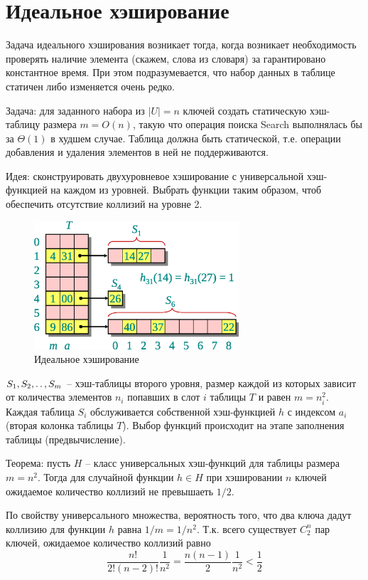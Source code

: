 \documentclass[11pt]{article}
\begin{document}
\section{Идеальное хэширование}

Задача идеального хэширования возникает тогда, когда возникает необходимость проверять наличие элемента (скажем, слова из словаря) за гарантировано константное время. При этом подразумевается, что набор данных в таблице статичен либо изменяется очень редко.

Задача: для заданного набора из $|U| = n$ ключей создать статическую хэш-таблицу размера $m = O(n)$, такую что операция поиска Search выполнялась бы за $\Theta(1)$ в худшем случае. Таблица должна быть статической, т.е. операции добавления и удаления элементов в ней не поддерживаются.

Идея: сконструировать двухуровневое хэширование с универсальной хэш-функцией на каждом из уровней. Выбрать функции таким образом, чтоб обеспечить отсутствие коллизий на уровне 2.
\begin{figure}[ht]
  \centering
  \includegraphics[width=3in]{lecture8/ideal.eps}
  \caption{Идеальное хэширование}
  \label{fig:ideal}
\end{figure}

$S_1, S_2, \mathinner{\ldotp\ldotp}, S_m$ -- хэш-таблицы второго уровня, размер каждой из которых зависит от количества элементов $n_i$ попавших в слот $i$ таблицы $T$ и равен $m = n_i^2$. Каждая таблица $S_i$ обслуживается собственной хэш-функцией $h$ с индексом $a_i$ (вторая колонка таблицы $T$). Выбор функций происходит на этапе заполнения таблицы (предвычисление).

Теорема: пусть $H$ -- класс универсальных хэш-функций для таблицы размера $m = n^2$. Тогда для случайной функции $h \in H$ при хэшировании $n$ ключей ожидаемое количество коллизий не превышаеть $1/2$.

По свойству универсального множества, вероятность того, что два ключа дадут коллизию для функции $h$ равна $1/m = 1/n^2$. Т.к. всего существует $C_2^n$ пар ключей, ожидаемое количество коллизий равно
\begin{equation*}
  \frac{n!}{2!(n-2)!}\frac{1}{n^2} = \frac{n(n-1)}{2}\frac{1}{n^2} < \frac{1}{2}
\end{equation*}
\end{document}
